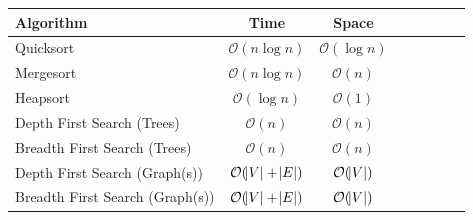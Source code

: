 \documentclass [12pt, executivepaper]{article}
\begin{document}
\vspace{3mm}

\resizebox{!}{!}
{

    \begin{tabular}{l*{6}{c}r}
    
    Algorithm & Time & Space \\
    
    \hline
    
   Quicksort & $\mathcal{O}(n \log{} n)$ & $\mathcal{O}(\log{} n)$  \\
    
   Mergesort & $\mathcal{O}(n \log{} n)$ & $\mathcal{O}(n)$  \\
    
   Heapsort & $\mathcal{O}(\log{} n)$ & $\mathcal{O}(1)$ \\
    
   Depth First Search (Trees) & $\mathcal{O}(n)$ & $\mathcal{O}(n)$  \\
    
   Breadth First Search (Trees) & $\mathcal{O}(n)$ & $\mathcal{O}(n)$  \\
    
   Depth First Search (Graph(s)) & $\mathcal{O}(\abs{V} + \abs{E})$ & $\mathcal{O}(\abs{V})$  \\
    
   Breadth First Search (Graph(s)) & $\mathcal{O}(\abs{V} + \abs{E})$ & $\mathcal{O}(\abs{V})$
    
    \end{tabular}
}

\pagebreak

\vspace*{-40mm}
\end{document}
